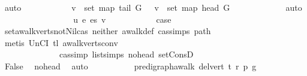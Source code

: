 \begin{isabellebody}
\ auto\isanewline
\ \ \ \ \ \ \ \ \isamarkupfalse%
\ \isamarkupfalse%
\ {\isachardoublequoteopen}v\ {\isasymin}\ set\ {\isacharparenleft}{\kern0pt}map\ {\isacharparenleft}{\kern0pt}tail\ G{\isacharparenright}{\kern0pt}\ {\isacharbrackleft}{\kern0pt}{\isacharbrackright}{\kern0pt}{\isacharparenright}{\kern0pt}\ {\isasymLongrightarrow}\ v\ {\isasymin}\ set\ {\isacharparenleft}{\kern0pt}map\ {\isacharparenleft}{\kern0pt}head\ G{\isacharparenright}{\kern0pt}\ {\isacharbrackleft}{\kern0pt}{\isacharbrackright}{\kern0pt}{\isacharparenright}{\kern0pt}{\isachardoublequoteclose}\isanewline
\ \ \ \ \ \ \ \ \ \ \isamarkupfalse%
\ auto\isanewline
\ \ \ \ \ \ \isamarkupfalse%
\isanewline
\ \ \ \ \ \ \ \ \isamarkupfalse%
\ {\isacharparenleft}{\kern0pt}{}\ u\ e\ es\ v{\isacharparenright}{\kern0pt}\isanewline
\ \ \ \ \ \ \ \ \isamarkupfalse%
\ \isamarkupfalse%
\ {\isacharquery}{\kern0pt}case\isanewline
\ \ \ \ \ \ \ \ \ \ \isamarkupfalse%
\ set{\isacharunderscore}{\kern0pt}awalk{\isacharunderscore}{\kern0pt}verts{\isacharunderscore}{\kern0pt}not{\isacharunderscore}{\kern0pt}Nil{\isacharunderscore}{\kern0pt}cas\ neither\ awalk{\isacharunderscore}{\kern0pt}def\ cas{\isachardot}{\kern0pt}simps{\isacharparenleft}{\kern0pt}{}{\isacharparenright}{\kern0pt}\ path\isanewline
\ \ \ \ \ \ \ \ \ \ \isamarkupfalse%
\ {\isacharparenleft}{\kern0pt}metis\ UnCI\ tl{}\ awalk{\isacharunderscore}{\kern0pt}verts{\isacharunderscore}{\kern0pt}conv{\isacharprime}{\kern0pt}\isanewline
\ \ \ \ \ \ \ \ \ \ \ \ \ \ cas{\isacharunderscore}{\kern0pt}simp\ list{\isachardot}{\kern0pt}simps{\isacharparenleft}{\kern0pt}{}{\isacharparenright}{\kern0pt}\ no{\isacharunderscore}{\kern0pt}head\ set{\isacharunderscore}{\kern0pt}ConsD{\isacharparenright}{\kern0pt}\ \ \isanewline
\ \ \ \ \ \ \isamarkupfalse%
\ \ \isanewline
\ \ \ \ \ \ \isamarkupfalse%
\ \isamarkupfalse%
\ False\ \isamarkupfalse%
\ no{\isacharunderscore}{\kern0pt}head\ \isamarkupfalse%
\ auto\isanewline
\ \ \ \ \isamarkupfalse%
\isanewline
\ \ \ \ \isamarkupfalse%
\ {\isachardoublequoteopen}pre{\isacharunderscore}{\kern0pt}digraph{\isachardot}{\kern0pt}awalk\ {\isacharparenleft}{\kern0pt}del{\isacharunderscore}{\kern0pt}vert\ t{\isacharparenright}{\kern0pt}\ r\ p\ g{\isachardoublequoteclose}\ \isanewline
\ \ \ \ \ \ \isamarkupfalse%

\end{isabellebody}
